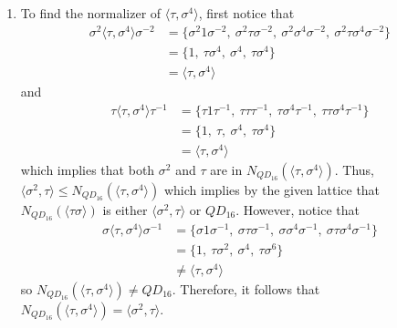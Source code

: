 \begin{solution}
\begin{enumerate}[label = \textbf{(\alph*)}]
        \item To find the normalizer of $\langle \tau, \sigma^4 \rangle$, first notice that
        \begin{align*}
            \sigma^2\langle \tau, \sigma^4 \rangle \sigma^{-2} &= \{\sigma^2 1 \sigma^{-2}, \ \sigma^2 \tau \sigma^{-2}, \ \sigma^2 \sigma^4 \sigma^{-2}, \ \sigma^2 \tau\sigma^4 \sigma^{-2}\} \\
            &= \{1, \ \tau\sigma^4, \ \sigma^4, \ \tau\sigma^4\} \\
            &= \langle \tau, \sigma^4 \rangle
        \end{align*}
        and 
        \begin{align*}
            \tau\langle \tau, \sigma^4 \rangle \tau^{-1} &= \{\tau 1 \tau^{-1}, \ \tau \tau \tau^{-1}, \ \tau \sigma^4 \tau^{-1}, \ \tau \tau\sigma^4 \tau^{-1}\} \\
            &= \{1, \ \tau, \ \sigma^4, \ \tau\sigma^4\} \\
            &= \langle \tau, \sigma^4 \rangle
        \end{align*}
        which implies that both $\sigma^2$ and $\tau$ are in $N_{QD_{16}}(\langle \tau, \sigma^4 \rangle)$. Thus, $\langle \sigma^2, \tau \rangle \leq N_{QD_{16}}(\langle \tau, \sigma^4 \rangle)$ which implies by the given lattice that $N_{QD_{16}}(\langle \tau\sigma \rangle)$ is either $\langle \sigma^2, \tau \rangle$ or $QD_{16}$. However, notice that 
        \begin{align*}
            \sigma\langle \tau, \sigma^4 \rangle \sigma^{-1} &= \{\sigma 1 \sigma^{-1}, \ \sigma \tau \sigma^{-1}, \ \sigma \sigma^4 \sigma^{-1}, \ \sigma \tau\sigma^4 \sigma^{-1}\} \\
            &= \{1, \ \tau\sigma^2, \ \sigma^4, \ \tau\sigma^6\} \\
            &\neq \langle \tau, \sigma^4 \rangle
        \end{align*}
        so $N_{QD_{16}}(\langle \tau, \sigma^4 \rangle) \neq QD_{16}$. Therefore, it follows that $N_{QD_{16}}(\langle \tau, \sigma^4 \rangle) = \langle \sigma^2, \tau \rangle$. \\ 
    \end{enumerate}
\end{solution}